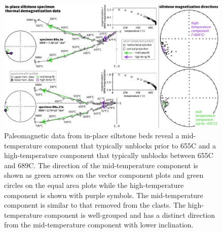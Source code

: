 \documentclass[draft]{agujournal2019}
\begin{document}
\begin{figure}[!ht]
\noindent\includegraphics[width=\textwidth]{Fig3_BRa_pmag.pdf}
\caption{\small{Paleomagnetic data from in-place siltstone beds reveal a mid-temperature component that typically unblocks prior to 655\textdegree C and a high-temperature component that typically unblocks between 655\textdegree C and 689\textdegree C. The direction of the mid-temperature component is shown as green arrows on the vector component plots and green circles on the equal area plots while the high-temperature component is shown with purple symbols. The mid-temperature component is similar to that removed from the clasts. The high-temperature component is well-grouped and has a distinct direction from the mid-temperature component with lower inclination.}}
\label{fig:insitu_pmag}
\end{figure}
\end{document}
